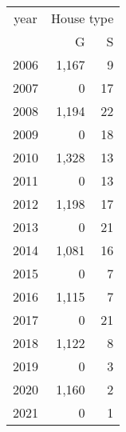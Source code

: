 \footnotesize\begin{tabular}[t]{lrr}
\toprule
\multicolumn{1}{c}{year} & \multicolumn{2}{c}{House type} \\
\cmidrule(l{3pt}r{3pt}){1-1} \cmidrule(l{3pt}r{3pt}){2-3}
  & G & S\\
\midrule
2006 & 1,167 & 9\\
2007 & 0 & 17\\
2008 & 1,194 & 22\\
2009 & 0 & 18\\
2010 & 1,328 & 13\\
2011 & 0 & 13\\
2012 & 1,198 & 17\\
2013 & 0 & 21\\
2014 & 1,081 & 16\\
2015 & 0 & 7\\
2016 & 1,115 & 7\\
2017 & 0 & 21\\
2018 & 1,122 & 8\\
2019 & 0 & 3\\
2020 & 1,160 & 2\\
2021 & 0 & 1\\
\bottomrule
\end{tabular}
